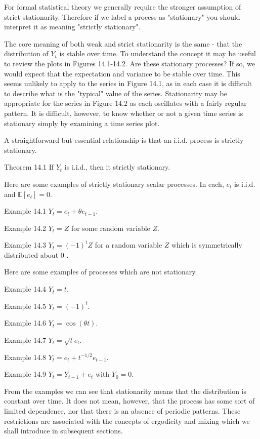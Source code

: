 \documentclass[10pt]{article}
\begin{document}
For formal statistical theory we generally require the stronger assumption of strict stationarity. Therefore if we label a process as "stationary" you should interpret it as meaning "strictly stationary".

The core meaning of both weak and strict stationarity is the same - that the distribution of $Y_{t}$ is stable over time. To understand the concept it may be useful to review the plots in Figures 14.1-14.2. Are these stationary processes? If so, we would expect that the expectation and variance to be stable over time. This seems unlikely to apply to the series in Figure 14.1, as in each case it is difficult to describe what is the "typical" value of the series. Stationarity may be appropriate for the series in Figure $14.2$ as each oscillates with a fairly regular pattern. It is difficult, however, to know whether or not a given time series is stationary simply by examining a time series plot.

A straightforward but essential relationship is that an i.i.d. process is strictly stationary.

Theorem 14.1 If $Y_{t}$ is i.i.d., then it strictly stationary.

Here are some examples of strictly stationary scalar processes. In each, $e_{t}$ is i.i.d. and $\mathbb{E}\left[e_{t}\right]=0$.

Example 14.1 $Y_{t}=e_{t}+\theta e_{t-1}$.

Example 14.2 $Y_{t}=Z$ for some random variable $Z$.

Example 14.3 $Y_{t}=(-1)^{t} Z$ for a random variable $Z$ which is symmetrically distributed about 0 .

Here are some examples of processes which are not stationary.

Example 14.4 $Y_{t}=t$.

Example 14.5 $Y_{t}=(-1)^{t}$.

Example 14.6 $Y_{t}=\cos (\theta t)$.

Example 14.7 $Y_{t}=\sqrt{t} e_{t}$.

Example 14.8 $Y_{t}=e_{t}+t^{-1 / 2} e_{t-1}$.

Example 14.9 $Y_{t}=Y_{t-1}+e_{t}$ with $Y_{0}=0$.

From the examples we can see that stationarity means that the distribution is constant over time. It does not mean, however, that the process has some sort of limited dependence, nor that there is an absence of periodic patterns. These restrictions are associated with the concepts of ergodicity and mixing which we shall introduce in subsequent sections.
\end{document}

